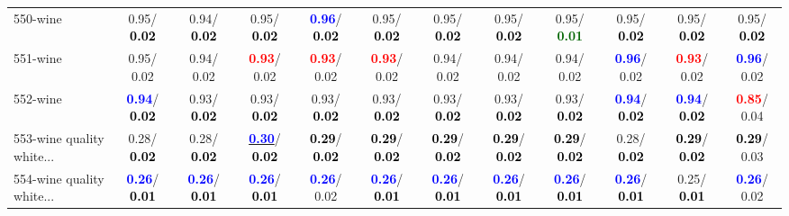 \begin{table}[h]
\begin{center}
{\begin{tabular}{lc|c|c|c|c|c|c|c|c|c|c}
550-wine &   0.95/\textcolor{black}{\textbf{  0.02}} &   0.94/\textcolor{black}{\textbf{  0.02}} &   0.95/\textcolor{black}{\textbf{  0.02}} & \textcolor{blue}{\textbf{  0.96}}/\textcolor{black}{\textbf{  0.02}} &   0.95/\textcolor{black}{\textbf{  0.02}} &   0.95/\textcolor{black}{\textbf{  0.02}} &   0.95/\textcolor{black}{\textbf{  0.02}} &   0.95/\textcolor{darkgreen}{\textbf{  0.01}} &   0.95/\textcolor{black}{\textbf{  0.02}} &   0.95/\textcolor{black}{\textbf{  0.02}} &   0.95/\textcolor{black}{\textbf{  0.02}} \\
551-wine &   0.95/  0.02 &   0.94/  0.02 & \textcolor{red}{\textbf{  0.93}}/  0.02 & \textcolor{red}{\textbf{  0.93}}/  0.02 & \textcolor{red}{\textbf{  0.93}}/  0.02 &   0.94/  0.02 &   0.94/  0.02 &   0.94/  0.02 & \textcolor{blue}{\textbf{  0.96}}/  0.02 & \textcolor{red}{\textbf{  0.93}}/  0.02 & \textcolor{blue}{\textbf{  0.96}}/  0.02 \\ \hline
552-wine & \textcolor{blue}{\textbf{  0.94}}/\textcolor{black}{\textbf{  0.02}} &   0.93/\textcolor{black}{\textbf{  0.02}} &   0.93/\textcolor{black}{\textbf{  0.02}} &   0.93/\textcolor{black}{\textbf{  0.02}} &   0.93/\textcolor{black}{\textbf{  0.02}} &   0.93/\textcolor{black}{\textbf{  0.02}} &   0.93/\textcolor{black}{\textbf{  0.02}} &   0.93/\textcolor{black}{\textbf{  0.02}} & \textcolor{blue}{\textbf{  0.94}}/\textcolor{black}{\textbf{  0.02}} & \textcolor{blue}{\textbf{  0.94}}/\textcolor{black}{\textbf{  0.02}} & \textcolor{red}{\textbf{  0.85}}/  0.04 \\
553-wine quality white... &   0.28/\textcolor{black}{\textbf{  0.02}} &   0.28/\textcolor{black}{\textbf{  0.02}} & \underline{\textcolor{blue}{\textbf{  0.30}}}/\textcolor{black}{\textbf{  0.02}} & \textcolor{black}{\textbf{  0.29}}/\textcolor{black}{\textbf{  0.02}} & \textcolor{black}{\textbf{  0.29}}/\textcolor{black}{\textbf{  0.02}} & \textcolor{black}{\textbf{  0.29}}/\textcolor{black}{\textbf{  0.02}} & \textcolor{black}{\textbf{  0.29}}/\textcolor{black}{\textbf{  0.02}} & \textcolor{black}{\textbf{  0.29}}/\textcolor{black}{\textbf{  0.02}} &   0.28/\textcolor{black}{\textbf{  0.02}} & \textcolor{black}{\textbf{  0.29}}/\textcolor{black}{\textbf{  0.02}} & \textcolor{black}{\textbf{  0.29}}/  0.03 \\
554-wine quality white... & \textcolor{blue}{\textbf{  0.26}}/\textcolor{black}{\textbf{  0.01}} & \textcolor{blue}{\textbf{  0.26}}/\textcolor{black}{\textbf{  0.01}} & \textcolor{blue}{\textbf{  0.26}}/\textcolor{black}{\textbf{  0.01}} & \textcolor{blue}{\textbf{  0.26}}/  0.02 & \textcolor{blue}{\textbf{  0.26}}/\textcolor{black}{\textbf{  0.01}} & \textcolor{blue}{\textbf{  0.26}}/\textcolor{black}{\textbf{  0.01}} & \textcolor{blue}{\textbf{  0.26}}/\textcolor{black}{\textbf{  0.01}} & \textcolor{blue}{\textbf{  0.26}}/\textcolor{black}{\textbf{  0.01}} & \textcolor{blue}{\textbf{  0.26}}/\textcolor{black}{\textbf{  0.01}} &   0.25/\textcolor{black}{\textbf{  0.01}} & \textcolor{blue}{\textbf{  0.26}}/  0.02 \\

\end{tabular}}
\end{center}
\end{table}
